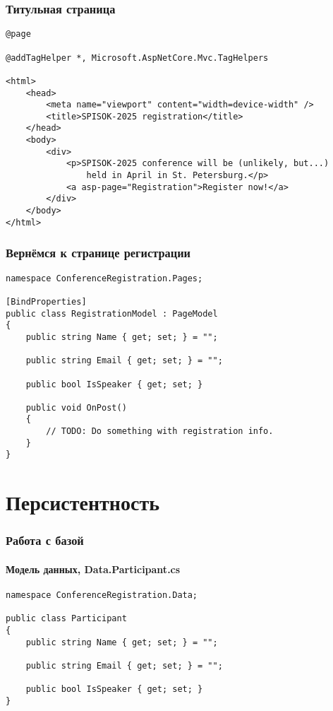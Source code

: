 \documentclass{../../slides-style}
\begin{document}
    \begin{frame}[fragile]
        \frametitle{Титульная страница}
        \begin{footnotesize}
            \begin{verbatim}
@page

@addTagHelper *, Microsoft.AspNetCore.Mvc.TagHelpers

<html>
    <head>
        <meta name="viewport" content="width=device-width" />
        <title>SPISOK-2025 registration</title>
    </head>
    <body>
        <div>
            <p>SPISOK-2025 conference will be (unlikely, but...) 
                held in April in St. Petersburg.</p>
            <a asp-page="Registration">Register now!</a>
        </div>
    </body>
</html>
            \end{verbatim}
        \end{footnotesize}
    \end{frame}

    \begin{frame}[fragile]
        \frametitle{Вернёмся к странице регистрации}
        \begin{footnotesize}
            \begin{verbatim}
namespace ConferenceRegistration.Pages;

[BindProperties]
public class RegistrationModel : PageModel
{
    public string Name { get; set; } = "";

    public string Email { get; set; } = "";

    public bool IsSpeaker { get; set; }

    public void OnPost()
    {
        // TODO: Do something with registration info.
    }
}
            \end{verbatim}
        \end{footnotesize}
    \end{frame}

    \section{Персистентность}

    \begin{frame}[fragile]
        \frametitle{Работа с базой}
        \framesubtitle{Модель данных, Data.Participant.cs}
        \begin{footnotesize}
            \begin{verbatim}
namespace ConferenceRegistration.Data;

public class Participant
{
    public string Name { get; set; } = "";

    public string Email { get; set; } = "";

    public bool IsSpeaker { get; set; }
}
            \end{verbatim}
        \end{footnotesize}
    \end{frame}
\end{document}
